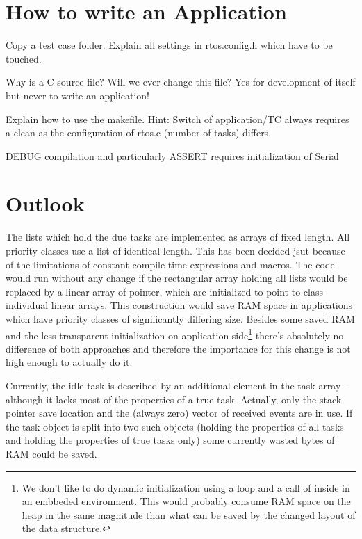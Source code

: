 \chapter{How to write an Application}
\label{secHowToWriteApp}

Copy a test case folder. Explain all settings in rtos.config.h which have
to be touched.

Why is \rtos{} a C source file? Will we ever change this file? Yes for
development of \rtos{} itself but never to write an application!

Explain how to use the makefile. Hint: Switch of application/TC always
requires a clean as the configuration of rtos.c (number of tasks) differs.

DEBUG compilation and particularly ASSERT requires initialization of Serial



\chapter{Outlook}
\label{secOutlook}

The lists which hold the due tasks are implemented as arrays of fixed
length. All priority classes use a list of identical length. This has been
decided jsut because of the limitations of constant compile time
expressions and macros. The code would run without any change if the
rectangular array holding all lists would be replaced by a linear array of
pointer, which are initialized to point to class-individual linear arrays.
This construction would save RAM space in applications which have priority
classes of significantly differing size. Besides some saved RAM and the
less transparent initialization on application side\footnote{We don't like
to do dynamic initialization using a loop and a call of 
inside in an embbeded environment. This would probably consume RAM space
on the heap in the same magnitude than what can be saved by the changed
layout of the data structure.} there's absolutely no difference of
both approaches and therefore the importance for this change is not high
enough to actually do it.

Currently, the idle task is described by an additional element in the task
array -- although it lacks most of the properties of a true task.
Actually, only the stack pointer save location and the (always zero)
vector of received events are in use. If the task object is split into two
such objects (holding the properties of all tasks and holding the
properties of true tasks only) some currently wasted bytes of RAM could be
saved.

